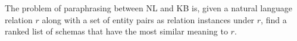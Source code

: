 

%


\begin{definition}
The problem of paraphrasing between NL and KB is,
given a natural language relation $r$ along with a set of
entity pairs as relation instances under $r$,
find a ranked list of schemas that have the most similar meaning
to $r$.
\end{definition}


